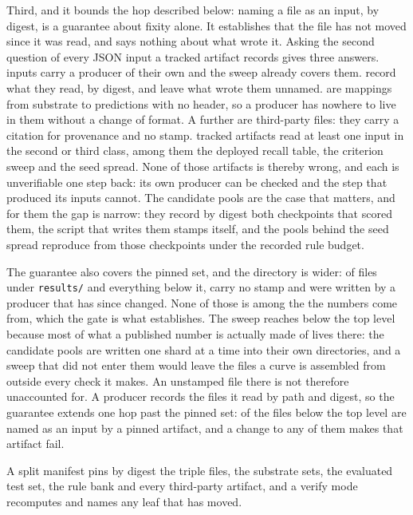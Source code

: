 \documentclass[journal=jcisd8,manuscript=suppinfo,layout=onecolumn]{achemso}
\begin{document}
Third, and it bounds the hop described below: naming a file as an input, by digest, is a guarantee
about fixity alone. It establishes that the file has not moved since it was read, and says
nothing about what wrote it. Asking the second question of every JSON input a
tracked artifact records gives three answers. \numInprovStamped{} inputs carry a producer of their
own and the sweep already covers them. \numInprovHalf{} record what they read, by digest, and leave
what wrote them unnamed. \numInprovBare{} are mappings from substrate to predictions with no
header, so a producer has nowhere to live in them without a change of format. A further
\numInprovNotoursWord{} are third-party files: they carry a citation for provenance and no stamp.
\numInprovConsumers{} tracked artifacts read at least one input in the second or third class,
among them the deployed recall table, the criterion sweep and the seed spread. None of those
artifacts is thereby wrong, and each is unverifiable one step back: its own producer can be
checked and the step that produced its inputs cannot. The candidate pools are the case that
matters, and for them the gap is narrow: they record by digest both checkpoints
that scored them, the script that writes them stamps itself, and the pools behind the seed spread
reproduce from those checkpoints under the recorded rule budget.

The guarantee also covers the pinned set, and the directory is wider: of \numProvFiles{} files under
\texttt{results/} and everything below it, \numProvUnstamped{} carry no stamp and
\numProvChanged{} were written by a producer that has since changed. None of those is among the
\numProvSources{} the numbers come from, which the gate is what establishes. The sweep reaches
below the top level because most of what a published number is actually made of lives there:
the candidate pools are written one shard at a time into their own directories, and a sweep that
did not enter them would leave the files a curve is assembled from outside every check it makes.
An unstamped file there is not therefore unaccounted for. A producer records the files it read by
path and digest, so the guarantee extends one hop past the pinned set: \numProvNamedinputs{} of
the files below the top level are named as an input by a pinned artifact, and a change to any of
them makes that artifact fail.

A split manifest pins by digest the triple files, the substrate sets, the evaluated test set, the
rule bank and every third-party artifact, and a verify mode recomputes and names any leaf that has
moved.
\end{document}
